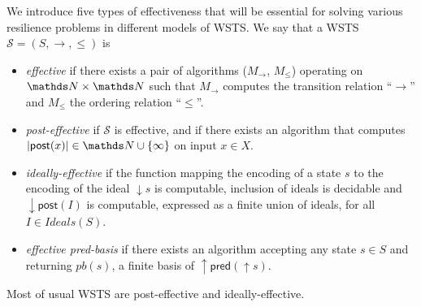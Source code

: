 \documentclass[runningheads]{llncs}
\newcommand{\pred}{\textsf{pred}}
\newcommand{\post}{\textsf{post}}
\begin{document}


We introduce five types of effectiveness \cite{BFM-ic17} that will be essential for solving various resilience problems in different models of WSTS.
\noindent
We say that a WSTS $\mathscr{S}=(S, \rightarrow, \leq)$ is 
\begin{itemize}
\item {\em effective} if there exists a pair of algorithms
($M_\rightarrow$, $M_\leq$) operating on $\N \times \N$ such that
$ M_\rightarrow$ computes the transition relation “$\rightarrow$” and 
$M_\leq$ the ordering relation “$\leq$”.
%
\item {\em post-effective} if $\mathscr{S}$ is effective, and if there
exists an algorithm that computes $|\post(x)| \in \N \cup \{\infty\}$ 
on input $x \in X$.
%
\item {\em ideally-effective} \cite{BFM-ic17} if the function mapping the encoding of a state $s$
to the encoding of the ideal $\downarrow s$ is computable, inclusion of ideals is decidable and $\downarrow \post(I)$ is computable, expressed as a finite union of ideals, for all $I \in Ideals(S)$.
%
%
\item {\em effective pred-basis} \cite{DBLP:journals/tcs/FinkelS01,DBLP:journals/iandc/AbdullaCJT00} if there exists an algorithm accepting
any state $s \in S$ and returning $pb(s)$, a finite basis of $\uparrow \pred(\uparrow s)$.
%
%
\end{itemize}
Most of usual WSTS are post-effective and ideally-effective.
\end{document}
